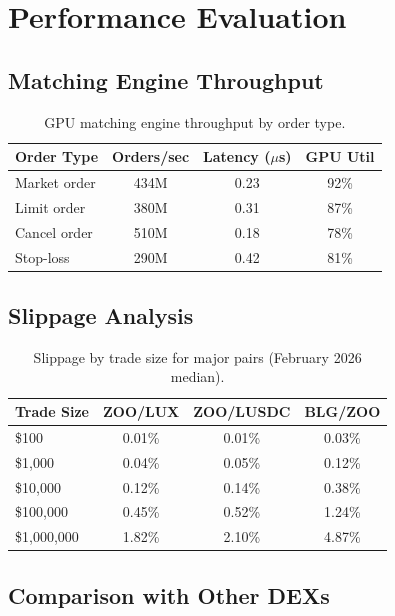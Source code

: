 \documentclass[11pt,letterpaper]{article}
\begin{document}
\section{Performance Evaluation}
\label{sec:performance}

\subsection{Matching Engine Throughput}

\begin{table}[t]
\centering
\begin{tabular}{lccc}
\toprule
\textbf{Order Type} & \textbf{Orders/sec} & \textbf{Latency ($\mu$s)} & \textbf{GPU Util} \\
\midrule
Market order & 434M & 0.23 & 92\% \\
Limit order & 380M & 0.31 & 87\% \\
Cancel order & 510M & 0.18 & 78\% \\
Stop-loss & 290M & 0.42 & 81\% \\
\bottomrule
\end{tabular}
\caption{GPU matching engine throughput by order type.}
\label{tab:matching}
\end{table}

\subsection{Slippage Analysis}

\begin{table}[t]
\centering
\begin{tabular}{lccc}
\toprule
\textbf{Trade Size} & \textbf{ZOO/LUX} & \textbf{ZOO/LUSDC} & \textbf{BLG/ZOO} \\
\midrule
\$100 & 0.01\% & 0.01\% & 0.03\% \\
\$1,000 & 0.04\% & 0.05\% & 0.12\% \\
\$10,000 & 0.12\% & 0.14\% & 0.38\% \\
\$100,000 & 0.45\% & 0.52\% & 1.24\% \\
\$1,000,000 & 1.82\% & 2.10\% & 4.87\% \\
\bottomrule
\end{tabular}
\caption{Slippage by trade size for major pairs (February 2026 median).}
\label{tab:slippage}
\end{table}

\subsection{Comparison with Other DEXs}
\end{document}
